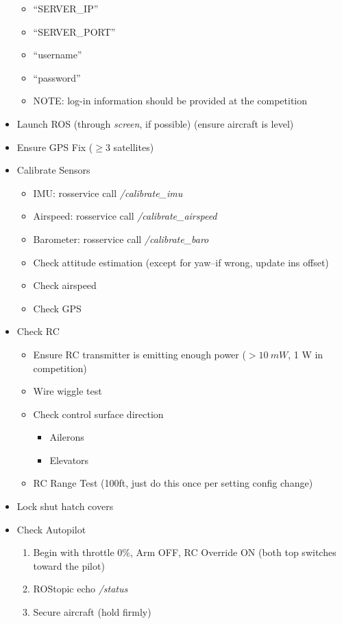\documentclass[]{auvsi_doc}
\begin{document}
\begin{itemize}
	\begin{itemize}
		\item ``SERVER\_IP''
		\item ``SERVER\_PORT''
		\item ``username''
		\item ``password'' 
		\item NOTE: log-in information should be provided at the competition
	\end{itemize}
	\item Launch ROS (through \textit{screen}, if possible) (ensure aircraft is level)
	\item Ensure GPS Fix ($\geq 3$ satellites)
	\item Calibrate Sensors
	\begin{itemize}
		\item IMU: rosservice call \textit{/calibrate\_imu}
		\item Airspeed: rosservice call \textit{/calibrate\_airspeed}
		\item Barometer: rosservice call \textit{/calibrate\_baro}
		\item Check attitude estimation (except for yaw--if wrong, update ins offset)
		\item Check airspeed
		\item Check GPS
	\end{itemize}
	\item Check RC
	\begin{itemize}
		\item Ensure RC transmitter is emitting enough power ($>10~mW$, 1 W in competition)
		\item Wire wiggle test
		\item Check control surface direction
		\begin{itemize}
			\item Ailerons
			\item Elevators
		\end{itemize}
		\item RC Range Test (100ft, just do this once per setting config change)
	\end{itemize}
	\item Lock shut hatch covers
	\item Check Autopilot
	\begin{enumerate}
		\item Begin with throttle 0\%, Arm OFF, RC Override ON (both top switches toward the pilot)
		\item ROStopic echo \textit{/status}
		\item Secure aircraft (hold firmly)

\end{enumerate}
\end{itemize}
\end{document}
